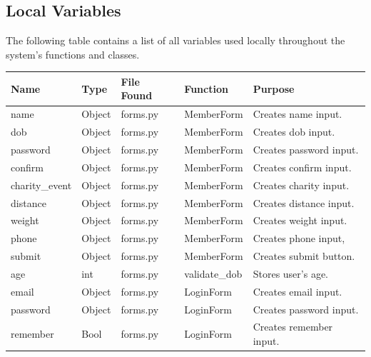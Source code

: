 \documentclass{article}[12pt,a4paper]
\begin{document}
\subsection{Local Variables}
The following table contains a list of all variables used locally throughout the system's functions and classes.
\begin{longtable}{|l|l|l|l|l|}
\hline
\textbf{Name}   & \textbf{Type} & \textbf{File Found} & \textbf{Function}       & \textbf{Purpose}                \\ \hline
name            & Object        & forms.py            & MemberForm              & Creates name input.         \\ \hline
dob             & Object        & forms.py            & MemberForm              & Creates dob input.          \\ \hline
password        & Object        & forms.py            & MemberForm              & Creates password input.     \\ \hline
confirm         & Object        & forms.py            & MemberForm              & Creates confirm input.      \\ \hline
charity\_event  & Object        & forms.py            & MemberForm              & Creates charity input.      \\ \hline
distance        & Object        & forms.py            & MemberForm              & Creates distance input.     \\ \hline
weight          & Object        & forms.py            & MemberForm              & Creates weight input.       \\ \hline
phone           & Object        & forms.py            & MemberForm              & Creates phone input,        \\ \hline
submit          & Object        & forms.py            & MemberForm              & Creates submit button.      \\ \hline
age             & int           & forms.py            & validate\_dob           & Stores user's age.          \\ \hline
email           & Object        & forms.py            & LoginForm               & Creates email input.        \\ \hline
password        & Object        & forms.py            & LoginForm               & Creates password input.     \\ \hline
remember        & Bool          & forms.py            & LoginForm               & Creates remember input.     \\ \hline

\end{longtable}
\end{document}
